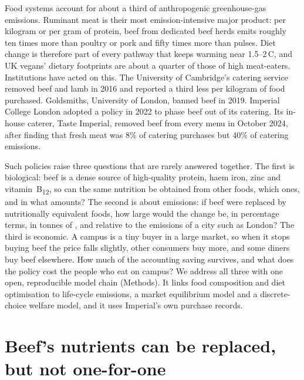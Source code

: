 \documentclass[10pt]{article}
\begin{document}
\vspace{6pt}
Food systems account for about a third of anthropogenic greenhouse-gas
emissions\cite{crippa2021}. Ruminant meat is their most emission-intensive major product: per kilogram or
per gram of protein, beef from dedicated beef herds emits roughly ten times more than poultry
or pork and fifty times more than pulses\cite{poore2018}. Diet change is therefore part of every
pathway that keeps warming near 1.5--2\,\textdegree{}C\cite{clark2020,springmann2018,willett2019}, and UK
vegans' dietary footprints are about a quarter of those of high meat-eaters\cite{scarborough2023}.
Institutions have acted on this. The University of Cambridge's catering service removed beef and
lamb in 2016 and reported a third less \COtwoe{} per kilogram of food purchased\cite{cambridge2019}.
Goldsmiths, University of London, banned beef in 2019\cite{goldsmiths2019}. Imperial College
London adopted a policy in 2022 to phase beef out of its catering\cite{imperial2022policy}. Its
in-house caterer, Taste Imperial, removed beef from every menu in October 2024, after finding that
fresh meat was 8\% of catering purchases but 40\% of catering emissions\cite{imperial2024beef}.

Such policies raise three questions that are rarely answered together. The first is biological:
beef is a dense source of high-quality protein, haem iron, zinc and vitamin~B\textsubscript{12}, so
can the same nutrition be obtained from other foods, which ones, and in what amounts? The
second is about emissions: if beef were replaced by nutritionally equivalent foods, how large
would the change be, in percentage terms, in tonnes of \COtwoe{}, and relative to the emissions of
a city such as London? The third is economic. A campus is a tiny buyer in a large market, so
when it stops buying beef the price falls slightly, other consumers buy more, and some diners
buy beef elsewhere. How much of the accounting saving survives, and what does the policy cost
the people who eat on campus? We address all three with one open, reproducible model chain
(Methods). It links food composition and diet optimisation to life-cycle emissions, a market
equilibrium model and a discrete-choice welfare model, and it uses Imperial's own purchase records.

\section{Beef's nutrients can be replaced, but not one-for-one}
\end{document}
